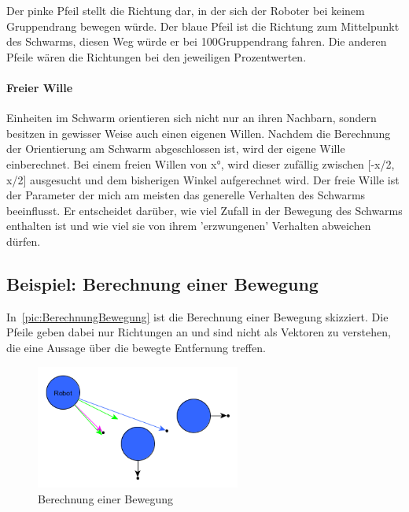 Der pinke Pfeil stellt die Richtung dar, in der sich der Roboter bei keinem Gruppendrang bewegen würde. Der blaue Pfeil ist die Richtung zum Mittelpunkt des Schwarms, diesen Weg würde er bei 100\per Gruppendrang fahren. Die anderen Pfeile wären die Richtungen bei den jeweiligen Prozentwerten.

\paragraph*{Freier Wille} Einheiten im Schwarm orientieren sich nicht nur an ihren Nachbarn, sondern besitzen in gewisser Weise auch einen eigenen Willen. Nachdem die Berechnung der Orientierung am Schwarm abgeschlossen ist, wird der eigene Wille einberechnet. Bei einem freien Willen von x°, wird dieser zufällig zwischen [-x/2, x/2] ausgesucht und dem bisherigen Winkel aufgerechnet wird. Der freie Wille ist der Parameter der mich am meisten das generelle Verhalten des Schwarms beeinflusst. Er entscheidet darüber, wie viel Zufall in der Bewegung des Schwarms enthalten ist und wie viel sie von ihrem 'erzwungenen' Verhalten abweichen dürfen.

\subsection*{Beispiel: Berechnung einer Bewegung}


In~\autoref{pic:BerechnungBewegung} ist die Berechnung einer Bewegung skizziert. Die Pfeile geben dabei nur Richtungen an und sind nicht als Vektoren zu verstehen, die eine Aussage über die bewegte Entfernung treffen.

\begin{figure}[h]
	\centering
	\includegraphics[width=0.6\textwidth,keepaspectratio]{graphics/BerechnungBewegung.png}
	\caption{Berechnung einer Bewegung}
	\label{pic:BerechnungBewegung}
\end{figure}

